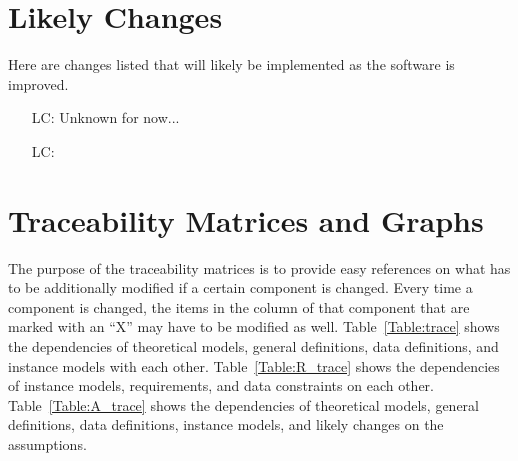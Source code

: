 \documentclass[12pt]{article}
\newcounter{lcnum} %
\begin{document}
\section{Likely Changes}    
Here are changes listed that will likely be implemented as the software is improved.

\noindent \begin{itemize}

\item[LC\refstepcounter{lcnum}\thelcnum\label{LC_meaningfulLabel0}:] Unknown for now...

\item[LC\refstepcounter{lcnum}\thelcnum\label{LC_meaningfulLabel}:] 

\end{itemize}

\section{Traceability Matrices and Graphs}

The purpose of the traceability matrices is to provide easy references on what
has to be additionally modified if a certain component is changed.  Every time a
component is changed, the items in the column of that component that are marked
with an ``X'' may have to be modified as well.  Table~\ref{Table:trace} shows the
dependencies of theoretical models, general definitions, data definitions, and
instance models with each other. Table~\ref{Table:R_trace} shows the
dependencies of instance models, requirements, and data constraints on each
other. Table~\ref{Table:A_trace} shows the dependencies of theoretical models,
general definitions, data definitions, instance models, and likely changes on
the assumptions.



\end{document}
